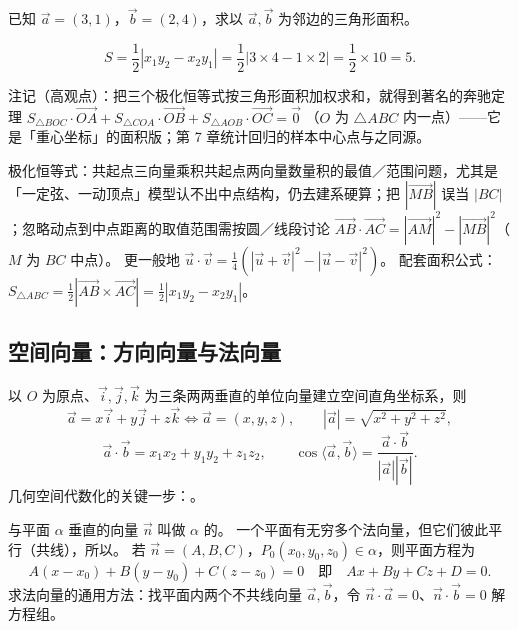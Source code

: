 \begin{explore}
\begin{example}
已知 $\vec a=(3,1)$，$\vec b=(2,4)$，求以 $\vec a,\vec b$ 为邻边的三角形面积。
\end{example}
\begin{solution}
\[
  S=\frac12|x_1y_2-x_2y_1|=\frac12|3\times4-1\times2|=\frac12\times10=5.
\]
\end{solution}

注记（高观点）：把三个极化恒等式按三角形面积加权求和，就得到著名的奔驰定理
$S_{\triangle BOC}\cdot\overrightarrow{OA}+S_{\triangle COA}\cdot\overrightarrow{OB}+S_{\triangle AOB}\cdot\overrightarrow{OC}=\vec 0$
（$O$ 为 $\triangle ABC$ 内一点）——它是「重心坐标」的面积版；第 7 章统计回归的样本中心点与之同源。

\begin{conccard}[二级]{极化恒等式：共起点三向量乘积}{共起点两向量数量积的最值／范围问题，尤其是「一定弦、一动顶点」模型}{认不出中点结构，仍去建系硬算；把 $|\overrightarrow{MB}|$ 误当 $|BC|$；忽略动点到中点距离的取值范围需按圆／线段讨论}
$\overrightarrow{AB}\cdot\overrightarrow{AC}=|\overrightarrow{AM}|^2-|\overrightarrow{MB}|^2$（$M$ 为 $BC$ 中点）。
更一般地 $\vec u\cdot\vec v=\frac14(|\vec u+\vec v|^2-|\vec u-\vec v|^2)$。
配套面积公式：$S_{\triangle ABC}=\frac12|\overrightarrow{AB}\times\overrightarrow{AC}|=\frac12|x_1y_2-x_2y_1|$。
\end{conccard}

\subsection{空间向量：方向向量与法向量}


以 $O$ 为原点、$\vec i,\vec j,\vec k$ 为三条两两垂直的单位向量建立空间直角坐标系，则
\[
  \vec a=x\vec i+y\vec j+z\vec k\iff \vec a=(x,y,z),\qquad
  |\vec a|=\sqrt{x^2+y^2+z^2},
\]
\[
  \vec a\cdot\vec b=x_1x_2+y_1y_2+z_1z_2,\qquad
  \cos\langle\vec a,\vec b\rangle=\frac{\vec a\cdot\vec b}{|\vec a||\vec b|}.
\]
几何空间代数化的关键一步：。

与平面 $\alpha$ 垂直的向量 $\vec n$ 叫做 $\alpha$ 的。
一个平面有无穷多个法向量，但它们彼此平行（共线），所以。
若 $\vec n=(A,B,C)$，$P_0(x_0,y_0,z_0)\in\alpha$，则平面方程为
\[
  A(x-x_0)+B(y-y_0)+C(z-z_0)=0\quad\text{即}\quad Ax+By+Cz+D=0.
\]
求法向量的通用方法：找平面内两个不共线向量 $\vec a,\vec b$，令 $\vec n\cdot\vec a=0$、$\vec n\cdot\vec b=0$ 解方程组。


\end{explore}
